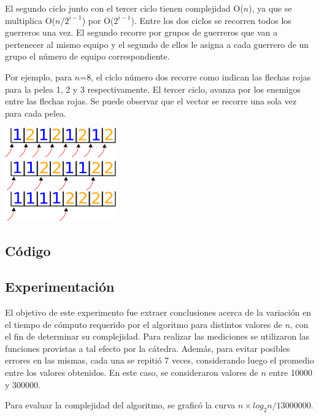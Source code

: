 El segundo ciclo junto con el tercer ciclo tienen complejidad O($n$), ya que se multiplica O($n/2^{i-1}$) por O($2^{i-1}$). Entre los dos ciclos se recorren todos los guerreros una vez. El segundo recorre por grupos de guerreros que van a pertenecer al mismo equipo y el segundo de ellos le asigna a cada guerrero de un grupo el número de equipo correspondiente. 

Por ejemplo, para $n$=8, el ciclo número dos recorre como indican las flechas rojas para la pelea 1, 2 y 3 respectivamente. El tercer ciclo, avanza por los enemigos entre las flechas rojas. Se puede observar que el vector se recorre una sola vez para cada pelea. 


\includegraphics[height=4cm]{graficos/ciclo.png}


    \subsection{Código}


    \subsection{Experimentación}
		El objetivo de este experimento fue extraer conclusiones acerca de la variación en el tiempo de cómputo requerido por el algoritmo para distintos valores de $n$, con el fin de determinar su complejidad. 
		Para realizar las mediciones se  utilizaron las funciones provistas a tal efecto por la cátedra. Además, para evitar posibles errores en las mismas, cada una se repitió 7 veces, considerando luego el promedio entre los valores obtenidos. En este caso, se consideraron valores de $n$ entre 10000 y 300000.

    Para evaluar la complejidad del algoritmo, se graficó la curva $n \times log_{2}n / 13000000$.

